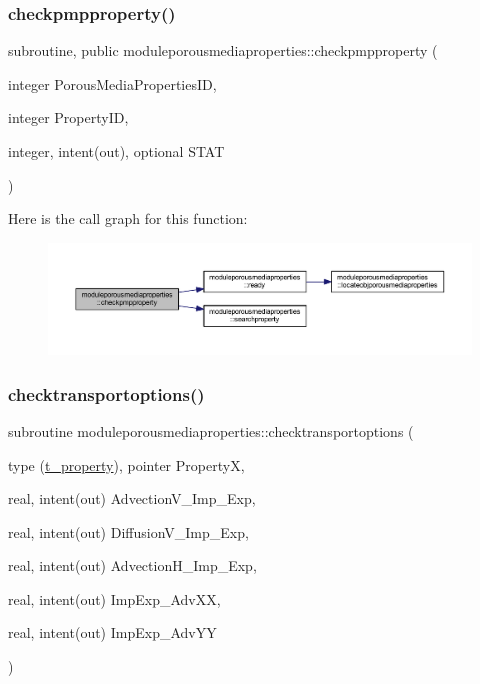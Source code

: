 \subsubsection{\texorpdfstring{checkpmpproperty()}{checkpmpproperty()}}
{\footnotesize\ttfamily subroutine, public moduleporousmediaproperties\+::checkpmpproperty (\begin{DoxyParamCaption}\item[{integer}]{Porous\+Media\+Properties\+ID,  }\item[{integer}]{Property\+ID,  }\item[{integer, intent(out), optional}]{S\+T\+AT }\end{DoxyParamCaption})}

Here is the call graph for this function\+:\nopagebreak
\begin{figure}[H]
\begin{center}
\leavevmode
\includegraphics[width=350pt]{namespacemoduleporousmediaproperties_aff227e766a06094629675d29f5f9e972_cgraph}
\end{center}
\end{figure}
\mbox{\label{namespacemoduleporousmediaproperties_a1f506b4d3d9d8a845ba272fe4a1b867e}} 
\subsubsection{\texorpdfstring{checktransportoptions()}{checktransportoptions()}}
{\footnotesize\ttfamily subroutine moduleporousmediaproperties\+::checktransportoptions (\begin{DoxyParamCaption}\item[{type (\mbox{\hyperlink{structmoduleporousmediaproperties_1_1t__property}{t\+\_\+property}}), pointer}]{PropertyX,  }\item[{real, intent(out)}]{Advection\+V\+\_\+\+Imp\+\_\+\+Exp,  }\item[{real, intent(out)}]{Diffusion\+V\+\_\+\+Imp\+\_\+\+Exp,  }\item[{real, intent(out)}]{Advection\+H\+\_\+\+Imp\+\_\+\+Exp,  }\item[{real, intent(out)}]{Imp\+Exp\+\_\+\+Adv\+XX,  }\item[{real, intent(out)}]{Imp\+Exp\+\_\+\+Adv\+YY }\end{DoxyParamCaption})\hspace{0.3cm}{\ttfamily [private]}}


